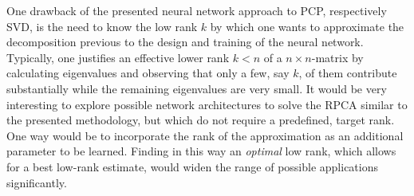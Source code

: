 One drawback of the presented neural network approach to PCP, respectively SVD, is the need to know the low rank $k$ by which one wants to approximate the decomposition previous to the design and training of the neural network. Typically, one justifies an effective lower rank $k<n$ of a $n\times n$-matrix by calculating eigenvalues and observing that only a few, say $k$, of them contribute substantially while the remaining eigenvalues are very small. It would be very interesting to explore possible network architectures to solve the RPCA similar to the presented methodology, but which do not require a predefined, target rank. One way would be to incorporate the rank of the approximation as an additional parameter to be learned. Finding in this way an \textit{optimal} low rank, which allows for a best low-rank estimate, would widen the range of possible applications significantly.

